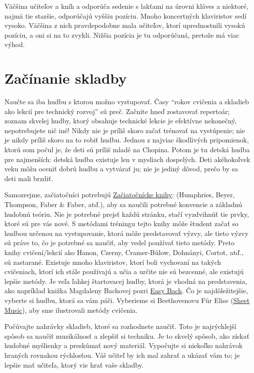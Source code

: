 \documentclass[11pt,a4paper]{book}
\begin{document}
Väčšina učiteľov a kníh a odporúča sedenie s lakťami na úrovni kláves a niektoré, najmä tie staršie, odporúčajú vyššiu pozíciu. Mnoho koncertných klaviristov sedí vysoko. Väčšina z nich pravdepodobne mala učiteľov, ktorí uprednostnili vysokú pozíciu, a oni si na to zvykli. Nižšia pozícia je tu odporúčaná, pretože má viac výhod.

\section{Začínanie skladby}\label{s:starting-piece}
Naučte sa iba hudbu s ktorou možno vystupovať. Časy “rokov cvičenia a skladieb ako lekcií pre technický rozvoj” sú preč. Začnite hneď zostavovať repertoár; zoznam skvelej hudby, ktorý obsahuje technické lekcie je efektívne nekonečný, nepotrebujete nič iné! Nikdy nie je príliš skoro začať trénovať na vystúpenie; nie je nikdy príliš skoro na to robiť hudbu. Jednou z najviac škodlivých pripomienok, ktorú som počul je, že deti sú príliš mladé na Chopina. Potom je tu detská hudba pre najmenších: detská hudba existuje len v mysliach dospelých. Deti akéhokoľvek veku môžu oceniť dobrú hudbu a vytvárať ju; nie je jediný dôvod, prečo by sa deti mali brzdiť.

Samozrejme, začiatočníci potrebujú \hyperlink{r:beginner-books}{Začiatočnícke knihy}: (Humphries, Beyer, Thompson, Faber \& Faber, atď.), aby sa naučili potrebné konvencie a základnú hudobnú teóriu. Nie je potrebné prejsť každú stránku, stačí vyzdvihnúť tie prvky, ktoré sú pre vás nové. S metódami tréningu tejto knihy môže študent začať so hudbou určenou na vystupovanie, ktorá môže predstavovať výzvy, ale tieto výzvy sú práve to, čo je potrebné sa naučiť, aby vedel používať tieto metódy. Preto knihy cvičení/lekcií ako Hanon, Czerny, Cramer-Bülow, Dohnányi, Cortot, atď., sú zastarané. Existuje mnoho klaviristov, ktorí boli vychovaní na takých cvičeniach, ktorí ich stále používajú a učia a určite nie sú bezcenné, ale existujú lepšie metódy. Je veľa ľahkej štartovacej hudby, ktorá je vhodná na predstavenia, ako napríklad knižka Magdaleny Bachovej pozri \hyperlink{r:easy-bach}{Easy Bach}. Čo je najdôležitejšie, vyberte si hudbu, ktorá sa vám páči. Vyberieme si Beethovenovu Für Elise (\hyperlink{r:sheet-music}{Sheet Music}), aby sme ilustrovali metódy cvičenia.

Počúvajte nahrávky skladieb, ktoré sa rozhodnete naučiť. Toto je najrýchlejší spôsob sa naučiť muzikálnosť a zlepšiť si techniku. Je to skvelý spôsob, ako získať hudobné myšlienky a preskúmať nový materiál. Vypočujte si niekoľko nahrávok hraných rovnakou rýchlosťou. Váš učiteľ by ich mal zahrať a ukázať vám to; je lepšie mať učiteľa, ktorý vie hrať vaše skladby.
\end{document}
